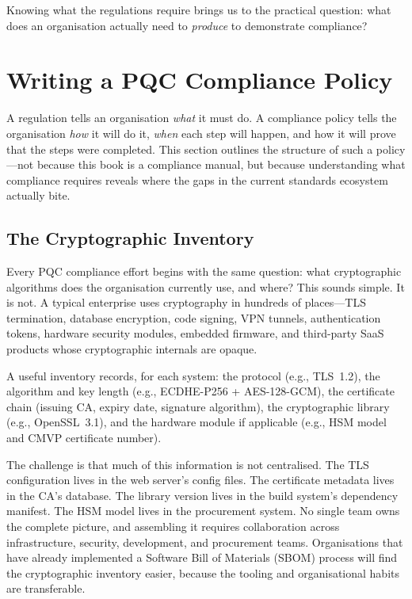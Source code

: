 Knowing what the regulations require brings us to the practical question: what does an organisation actually need to \emph{produce} to demonstrate compliance?


\section{Writing a PQC Compliance Policy}
\label{sec:compliance-policy}

A regulation tells an organisation \emph{what} it must do. A compliance policy tells the organisation \emph{how} it will do it, \emph{when} each step will happen, and how it will prove that the steps were completed. This section outlines the structure of such a policy---not because this book is a compliance manual, but because understanding what compliance requires reveals where the gaps in the current standards ecosystem actually bite.

\subsection{The Cryptographic Inventory}
\label{subsec:crypto-inventory}

Every PQC compliance effort begins with the same question: what cryptographic algorithms does the organisation currently use, and where? This sounds simple. It is not. A typical enterprise uses cryptography in hundreds of places---TLS termination, database encryption, code signing, VPN tunnels, authentication tokens, hardware security modules, embedded firmware, and third-party SaaS products whose cryptographic internals are opaque.

A useful inventory records, for each system: the protocol (e.g., TLS~1.2), the algorithm and key length (e.g., ECDHE-P256 + AES-128-GCM), the certificate chain (issuing CA, expiry date, signature algorithm), the cryptographic library (e.g., OpenSSL~3.1), and the hardware module if applicable (e.g., HSM model and CMVP certificate number).

The challenge is that much of this information is not centralised. The TLS configuration lives in the web server's config files. The certificate metadata lives in the CA's database. The library version lives in the build system's dependency manifest. The HSM model lives in the procurement system. No single team owns the complete picture, and assembling it requires collaboration across infrastructure, security, development, and procurement teams. Organisations that have already implemented a Software Bill of Materials (SBOM) process will find the cryptographic inventory easier, because the tooling and organisational habits are transferable.


